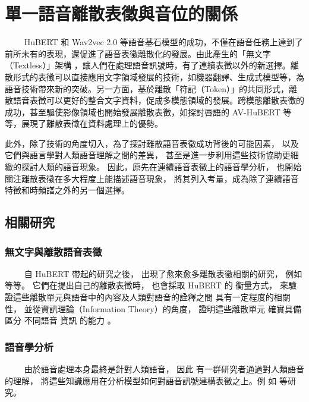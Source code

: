 \chapter{單一語音離散表徵與音位的關係}
　　
HuBERT \cite{hsu_hubert_2021, hsu_hubert_2021-2} 和 Wav2vec 2.0 \cite{baevski2020wav2vec} 等語音基石模型的成功，不僅在語音任務上達到了前所未有的表現，還促進了語音表徵離散化的發展。由此產生的「無文字（Textless）」架構 \cite{noauthor_textless_2021, lakhotia_generative_2021, lakhotia_generative_2021-1}，讓人們在處理語音訊號時，有了連續表徵以外的新選擇。離散形式的表徵可以直接應用文字領域發展的技術，如機器翻譯、生成式模型等，為語音技術帶來新的突破。另一方面，基於離散「符記（Token）」的共同形式，離散語音表徵可以更好的整合文字資料，促成多模態領域的發展。跨模態離散表徵的成功，甚至驅使影像領域也開始發展離散表徵，如探討唇語的 AV-HuBERT \cite{shi2021learning} 等等，展現了離散表徵在資料處理上的優勢。

此外，除了技術的角度切入，為了探討離散語音表徵成功背後的可能因素，
以及它們與語言學對人類語音理解之間的差異，
甚至是進一步利用這些技術協助更細緻的探討人類的語音現象。
因此，原先在連續語音表徵上的語音學分析，
也開始關注離散表徵在多大程度上能描述語音現象，
將其列入考量，成為除了連續語音特徵和時頻譜之外的另一個選擇。

\section{相關研究}

\subsection{無文字與離散語音表徵}
　　
自 HuBERT 帶起的研究之後，
出現了愈來愈多離散表徵相關的研究，
例如 \cite{10097097, abdullah23_interspeech, chang_exploration_2023, liu2024dinosr, zhang2024speechtokenizer, huang2023repcodec} 等等。
它們在提出自己的離散表徵時，
也會採取 HuBERT 的
衡量方式，
來驗證這些離散單元與語音中的內容及人類對語音的詮釋之間
具有一定程度的相關性，
並從資訊理論（Information Theory）的角度，
證明這些離散單元
確實具備區分
不同語音
資訊
的能力
。

\subsection{語音學分析}
　　
由於語音處理本身最終是針對人類語音，
因此
有一群研究者通過對人類語音的理解，
將這些知識應用在分析模型如何對語音訊號建構表徵之上。例
如 \cite{deseyssel22_interspeech, wells_phonetic_2022, 10097097, abdullah23_interspeech} 等研究。

